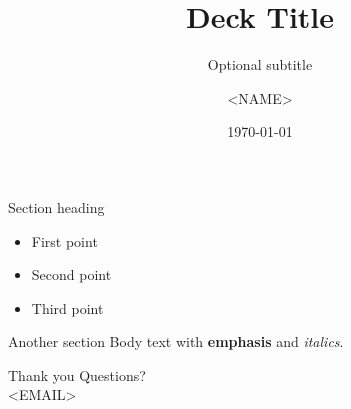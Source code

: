 \documentclass[aspectratio=169,12pt]{beamer}
\title{Deck Title}
\subtitle{Optional subtitle}
\author{<NAME>}
\institute{<INSTITUTE>}
\date{\today}
\begin{document}
\begin{frame}[plain]
  \titlepage
\end{frame}

\begin{frame}{Section heading}
  \begin{itemize}
    \item First point
    \item Second point
    \item Third point
  \end{itemize}
\end{frame}

\begin{frame}{Another section}
  Body text with \textbf{emphasis} and \emph{italics}.
\end{frame}

\begin{frame}[plain]{Thank you}
  \vfill
  \centering
  \Large Questions?\\[1em]
  \normalsize <EMAIL>
  \vfill
\end{frame}
\end{document}
